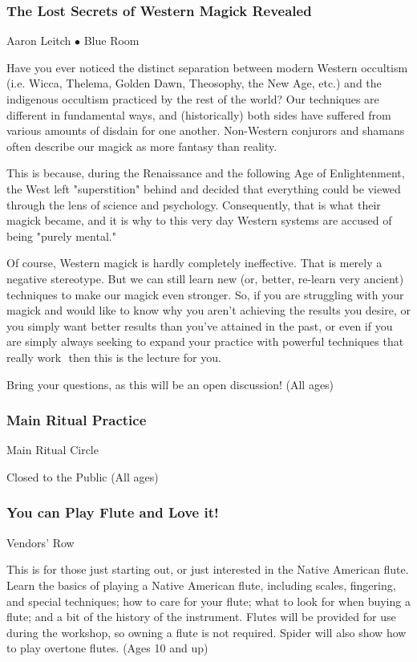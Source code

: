 \subsubsection{The Lost Secrets of Western Magick Revealed}
\label{Fri-Leitch2}
{\small Aaron Leitch $\bullet$  Blue Room}

 Have you ever noticed the distinct separation between modern Western occultism (i.e. Wicca, Thelema, Golden Dawn, Theosophy, the New Age, etc.) and the indigenous occultism practiced by the rest of the world? Our techniques are different in fundamental ways, and (historically) both sides have suffered from various amounts of disdain for one another.  Non-Western conjurors and shamans often describe our magick as more fantasy than reality.

This is because, during the Renaissance and the following Age of Enlightenment, the West left "superstition" behind and decided that everything could be viewed through the lens of science and psychology. Consequently, that is what their magick became, and it is why to this very day Western systems are accused of being "purely mental."

Of course, Western magick is hardly completely ineffective. That is merely a negative stereotype. But we can still learn new (or, better, re-learn very ancient) techniques to make our magick even stronger.  So, if you are struggling with your magick and would like to know why you aren't achieving the results you desire, or you simply want better results than you've attained in the past, or even if you are simply always seeking to expand your practice with powerful techniques that really work  then this is the lecture for you.

Bring your questions, as this will be an open discussion! {\small (All ages)}

\subsubsection{Main Ritual Practice}
\label{Fri-Prac3}
{\small  Main Ritual Circle}

 Closed to the Public {\small (All ages)}

\subsubsection{You can Play Flute and Love it!}
\label{Fri-Spider1}
{\small  Vendors' Row}

 This is for those just starting out, or just interested in the Native American flute. Learn the basics of playing a Native American flute, including scales, fingering, and special techniques; how to care for your flute; what to look for when buying a flute; and a bit of the history of the instrument. Flutes will be provided for use during the workshop, so owning a flute is not required. Spider will also show how to play overtone flutes. {\small (Ages 10 and up)}

